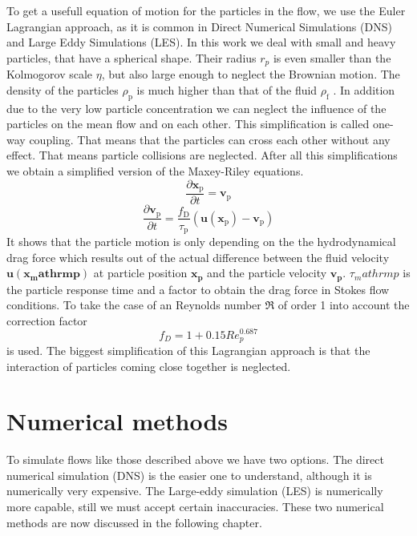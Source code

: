 \documentclass[a4paper,10pt]{article}
\renewcommand*\vec[1]{\boldsymbol{#1}}
\numberwithin{equation}{section} %
\begin{document}
To get a usefull equation of motion for the particles in the flow, we use the Euler Lagrangian approach, as it is common in Direct Numerical Simulations (DNS) and Large Eddy Simulations (LES).
In this work we deal with small and heavy particles, that have a spherical shape. Their radius $ r_p $ is even smaller than the Kolmogorov scale $ \eta $, but also large enough to neglect the Brownian motion. The density of the particles $ \rho_\mathrm{p} $ is much higher than that of the fluid $ \rho_\mathrm{f} $ . In addition due to the very low particle concentration we can neglect the influence of the particles on the mean flow and on each other. This simplification is called one-way coupling. That means that the particles can cross each other without any effect. That means particle collisions are neglected.
After all this simplifications we obtain a simplified version of the Maxey-Riley equations. 
\begin{equation}
 \frac{\partial{\vec{x_\mathrm{p}}}}{\partial{t}} = \vec{v_\mathrm{p}}
\end{equation}
\nomenclature{$\vec{x_\mathrm{p}}$}{Particle position}
\nomenclature{$\vec{v_\mathrm{p}}$}{Particle velocity}
\begin{equation}
 \frac{\partial{\vec{v_\mathrm{p}}}}{\partial{t}} = \frac{f_\mathrm{D}}{\tau_\mathrm{p}} (\vec{u(x_\mathrm{p})} - \vec{v_\mathrm{p}})
 \end{equation}
 It shows that the particle motion is only depending on the the hydrodynamical drag force which results out of the actual difference between the fluid velocity $\vec{u(x_mathrm{p})}$ at particle position $\vec{x_p}$ and the particle velocity $\vec{v_p}$.
 $\tau_mathrm{p}$ is the particle response time and a factor to obtain the drag force in Stokes flow conditions.
 To take the case of an Reynolds number $\Re$ of order 1 into account the correction factor 
 \begin{equation}
 f_D = 1 + 0.15 Re_p^\mathrm{0.687} 
 \end{equation}
 is used.
The biggest simplification of this Lagrangian approach is that the interaction of particles coming close together is neglected.
\pagebreak
\section{Numerical methods} %
To simulate flows like those described above we have two options. The direct numerical simulation (DNS) is the easier one to understand, although it is numerically very expensive. The Large-eddy simulation (LES) is numerically more capable, still we must accept certain inaccuracies. These two numerical methods are now discussed in the following chapter.
\end{document}
